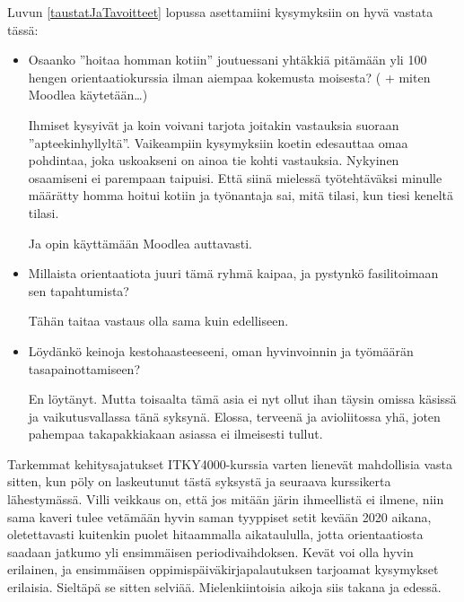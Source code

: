 \documentclass[utf8]{gradu3}
\begin{document}
Luvun \ref{taustatJaTavoitteet} lopussa asettamiini kysymyksiin on
hyvä vastata tässä:

\begin{itemize}
  \item Osaanko ”hoitaa homman kotiin” joutuessani yhtäkkiä pitämään yli
        100 hengen orientaatiokurssia ilman aiempaa kokemusta moisesta? ( +
        miten Moodlea käytetään…)

        Ihmiset kysyivät ja koin voivani tarjota joitakin vastauksia suoraan
        ''apteekinhyllyltä''. Vaikeampiin kysymyksiin koetin edesauttaa omaa
        pohdintaa, joka uskoakseni on ainoa tie kohti vastauksia. Nykyinen
        osaamiseni ei parempaan taipuisi. Että siinä mielessä työtehtäväksi
        minulle määrätty homma hoitui kotiin ja työnantaja sai, mitä tilasi,
        kun tiesi keneltä tilasi.

        Ja opin käyttämään Moodlea auttavasti.

  \item Millaista orientaatiota juuri tämä ryhmä kaipaa, ja pystynkö
        fasilitoimaan sen tapahtumista?

        Tähän taitaa vastaus olla sama kuin edelliseen.

  \item Löydänkö keinoja kestohaasteeseeni, oman hyvinvoinnin ja
        työmäärän tasapainottamiseen?

        En löytänyt. Mutta toisaalta tämä asia ei nyt ollut ihan täysin
        omissa käsissä ja vaikutusvallassa tänä syksynä. Elossa, terveenä ja
        avioliitossa yhä, joten pahempaa takapakkiakaan asiassa ei
        ilmeisesti tullut.
\end{itemize}


Tarkemmat kehitysajatukset ITKY4000-kurssia varten lienevät
mahdollisia vasta sitten, kun pöly on laskeutunut tästä syksystä ja
seuraava kurssikerta lähestymässä. Villi veikkaus on, että jos mitään
järin ihmeellistä ei ilmene, niin sama kaveri tulee vetämään hyvin
saman tyyppiset setit kevään 2020 aikana, oletettavasti kuitenkin
puolet hitaammalla aikataululla, jotta orientaatiosta saadaan jatkumo
yli ensimmäisen periodivaihdoksen. Kevät voi olla hyvin erilainen, ja
ensimmäisen oppimispäiväkirjapalautuksen tarjoamat kysymykset
erilaisia. Sieltäpä se sitten selviää. Mielenkiintoisia aikoja siis
takana ja edessä.

\printbibliography
\end{document}
